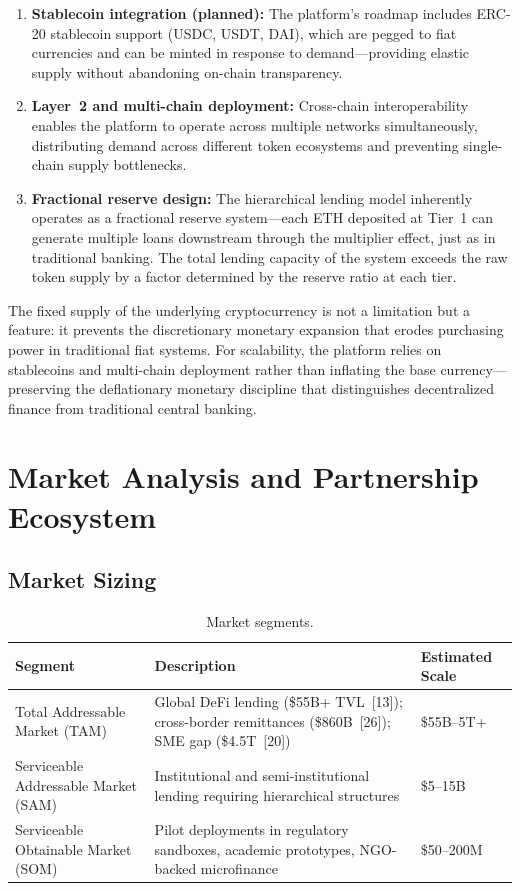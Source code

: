 \documentclass[12pt,a4paper]{report}
\newcommand{\tableheadfont}{\bfseries\small\color{PrimaryBlue}}
\newenvironment{moderntable}[1][H]{%
    \begin{table}[#1]\centering\small%
    \renewcommand{\arraystretch}{1.35}%
}{%
    \end{table}%
}
\begin{document}
\begin{enumerate}[noitemsep]
\item \textbf{Stablecoin integration (planned):} The platform's roadmap includes ERC-20 stablecoin support (USDC, USDT, DAI), which are pegged to fiat currencies and can be minted in response to demand---providing elastic supply without abandoning on-chain transparency.
\item \textbf{Layer~2 and multi-chain deployment:} Cross-chain interoperability enables the platform to operate across multiple networks simultaneously, distributing demand across different token ecosystems and preventing single-chain supply bottlenecks.
\item \textbf{Fractional reserve design:} The hierarchical lending model inherently operates as a fractional reserve system---each ETH deposited at Tier~1 can generate multiple loans downstream through the multiplier effect, just as in traditional banking. The total lending capacity of the system exceeds the raw token supply by a factor determined by the reserve ratio at each tier.
\end{enumerate}

The fixed supply of the underlying cryptocurrency is not a limitation but a feature: it prevents the discretionary monetary expansion that erodes purchasing power in traditional fiat systems. For scalability, the platform relies on stablecoins and multi-chain deployment rather than inflating the base currency---preserving the deflationary monetary discipline that distinguishes decentralized finance from traditional central banking.

\section{Market Analysis and Partnership Ecosystem}

\subsection{Market Sizing}

\begin{moderntable}
\caption{Market segments.}
\begin{tabular}{@{} >{\raggedright}p{4cm} >{\raggedright}p{5cm} >{\raggedright\arraybackslash}p{3cm} @{}}
\toprule
\tableheadfont Segment & \tableheadfont Description & \tableheadfont Estimated Scale \\
\midrule
\rowcolor{RowShade}
Total Addressable Market (TAM) & Global DeFi lending (\$55B+ TVL~[13]); cross-border remittances (\$860B~[26]); SME gap (\$4.5T~[20]) & \$55B--5T+ \\
Serviceable Addressable Market (SAM) & Institutional and semi-institutional lending requiring hierarchical structures & \$5--15B \\
\rowcolor{RowShade}
Serviceable Obtainable Market (SOM) & Pilot deployments in regulatory sandboxes, academic prototypes, NGO-backed microfinance & \$50--200M \\
\bottomrule
\end{tabular}
\end{moderntable}
\end{document}
